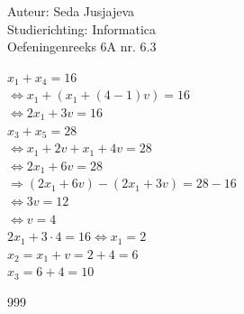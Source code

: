 \documentclass[a4paper]{article}
\begin{document}
\noindent \large Auteur: Seda Jusjajeva\\
\noindent \large Studierichting: Informatica\\
\noindent \large Oefeningenreeks 6A nr. 6.3\\

\medskip

\normalsize



$x_1 + x_4 = 16$ \\

$\Leftrightarrow x_1 + (x_1 + (4 - 1)v) = 16$ \\

$\Leftrightarrow 2x_1 + 3v = 16$ \\

$x_3 + x_5 = 28$ \\

$\Leftrightarrow x_1 + 2v + x_1 + 4v = 28$ \\

$\Leftrightarrow 2x_1 + 6v = 28$ \\

$\Rightarrow (2x_1 + 6v) - (2x_1 + 3v) = 28 - 16$ \\

$\Leftrightarrow 3v = 12$ \\

$\Leftrightarrow v = 4$ \\

$2x_1 + 3 \cdot 4 = 16 \Leftrightarrow x_1 = 2$ \\

$x_2 = x_1 + v = 2 + 4 = 6$ \\

$x_3 = 6 + 4 = 10$ \\




\begin{thebibliography}{999}
\end{thebibliography}
\end{document}
